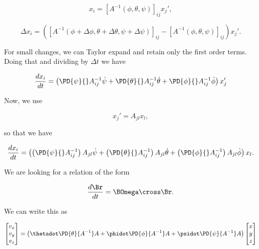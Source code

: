 \begin{equation}\label{eqn:classicalMechanicsEulerAngles:n}
x_i = [A^{-1}(\phi, \theta, \psi)]_{ij} x_j',
\end{equation}


\begin{equation}\label{eqn:classicalMechanicsEulerAngles:n}
\Delta x_i = 
\left(
[A^{-1}(\phi + \Delta \phi, \theta + \Delta \theta, \psi + \Delta \psi)]_{ij} 
-[A^{-1}(\phi, \theta, \psi)]_{ij} 
\right)
x_j'.
\end{equation}

For small changes, we can Taylor expand and retain only the first order terms.  Doing that and dividing by $\Delta t$ we have

\begin{equation}\label{eqn:classicalMechanicsEulerAngles:n}
\frac{d x_i}{dt} =
\left(
\PD{\psi}{} A^{-1}_{ij} \dot{\psi}
+\PD{\theta}{} A^{-1}_{ij} \dot{\theta}
+\PD{\phi}{} A^{-1}_{ij} \dot{\phi}
\right) x_j'
\end{equation}

Now, we use

\begin{equation}\label{eqn:classicalMechanicsEulerAngles:n}
x_j' = A_{jl} x_l,
\end{equation}

so that we have

\begin{equation}\label{eqn:classicalMechanicsEulerAngles:n}
\frac{d x_i}{dt} =
\left(
\left(\PD{\psi}{} A^{-1}_{ij} \right) A_{jl} \dot{\psi}
+\left(\PD{\theta}{} A^{-1}_{ij} \right) A_{jl} \dot{\theta}
+\left(\PD{\phi}{} A^{-1}_{ij} \right) A_{jl} \dot{\phi}
\right) x_l.
\end{equation}

We are looking for a relation of the form

\begin{equation}\label{eqn:classicalMechanicsEulerAngles:n}
\frac{d\Br}{dt} = \BOmega \cross \Br.
\end{equation}

We can write this as

\begin{equation}\label{eqn:classicalMechanicsEulerAngles:n}
\begin{bmatrix}
v_x \\
v_y \\
v_z
\end{bmatrix} 
=
\left(
\thetadot \PD{\theta}{A^{-1}} A
+\phidot \PD{\phi}{A^{-1}} A
+\psidot \PD{\psi}{A^{-1}} A
\right)
\begin{bmatrix}
x \\
y \\
z
\end{bmatrix} 
\end{equation}

